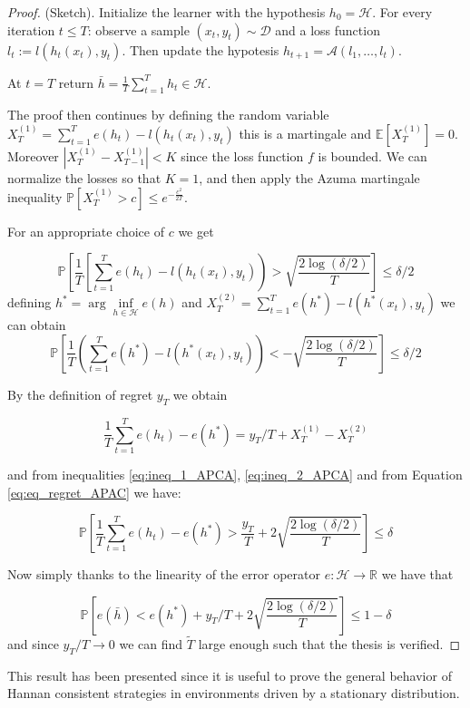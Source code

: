 \begin{proof}(Sketch).
Initialize the learner with the hypothesis $h_0=\mathcal H$.
For every iteration $t\le T$: observe a sample $(x_t,y_t)\sim\mathcal D$ and a loss function $l_t:=l(h_t(x_t),y_t)$. Then update the hypotesis $h_{t+1}=\mathcal A(l_1,\ldots,l_t)$.

At $t=T$ return $\bar{h}=\frac{1}{T}\sum\limits_{t=1}^T h_t\in\mathcal H$. 

The proof then continues by defining the random variable $X^{(1)}_T=\sum\limits_{t=1}^Te(h_t)-l(h_t(x_t),y_t)$ this is a martingale and $\mathbb E[X^{(1)}_T]=0$. Moreover $|X^{(1)}_T-X^{(1)}_{T-1}|<K$ since the loss function $f$ is bounded. We can normalize the losses so that $K=1$, and then apply the Azuma martingale inequality $\mathbb P[X^{(1)}_T>c]\le e^{-\frac{c^2}{2T}}$.

For an appropriate choice of $c$ we get

\begin{equation}\label{eq:ineq_1_APCA}
\mathbb P\left[\frac{1}{T}\left[\sum\limits_{t=1}^Te(h_t)-l(h_t(x_t),y_t)\right)>\sqrt{\frac{2\log(\delta/2)}{T}}\right]\le \delta/2
\end{equation}
defining $h^*=\arg\inf\limits_{h\in\mathcal H} e(h)$ and $X^{(2)}_T=\sum\limits_{t=1}^Te(h^*)-l(h^*(x_t),y_t)$ we can obtain
\begin{equation}\label{eq:ineq_2_APCA}
\mathbb P\left[\frac{1}{T}\left(\sum\limits_{t=1}^Te(h^*)-l(h^*(x_t),y_t)\right)<-\sqrt{\frac{2\log(\delta/2)}{T}}\right]\le \delta/2
\end{equation}

By the definition of regret $y_T$ we obtain

\begin{equation}\label{eq:eq_regret_APAC}
\frac{1}{T}\sum\limits_{t=1}^Te(h_t)-e(h^*)=y_T/T+X_T^{(1)}-X_T^{(2)}
\end{equation}

and from inequalities \eqref{eq:ineq_1_APCA}, \eqref{eq:ineq_2_APCA} and from Equation \eqref{eq:eq_regret_APAC} we have:

\begin{equation}
\mathbb P\left[\frac{1}{T}\sum\limits_{t=1}^Te(h_t)-e(h^*)>\frac{y_T}{T}+2\sqrt{\frac{2\log(\delta/2)}{T}}\right]\le \delta
\end{equation}

Now simply thanks to the linearity of the error operator $e:\mathcal H\to \mathbb R$ we have that 

$$\mathbb P\left[e(\bar h)<e(h^*)+y_T/T+2\sqrt{\frac{2\log(\delta/2)}{T}}\right]\le 1-\delta$$
and since $y_T/T\to0$ we can find $\tilde T$ large enough such that the thesis is verified.
\end{proof}

This result has been presented since it is useful to prove the general behavior of Hannan consistent strategies in environments driven by a stationary distribution.